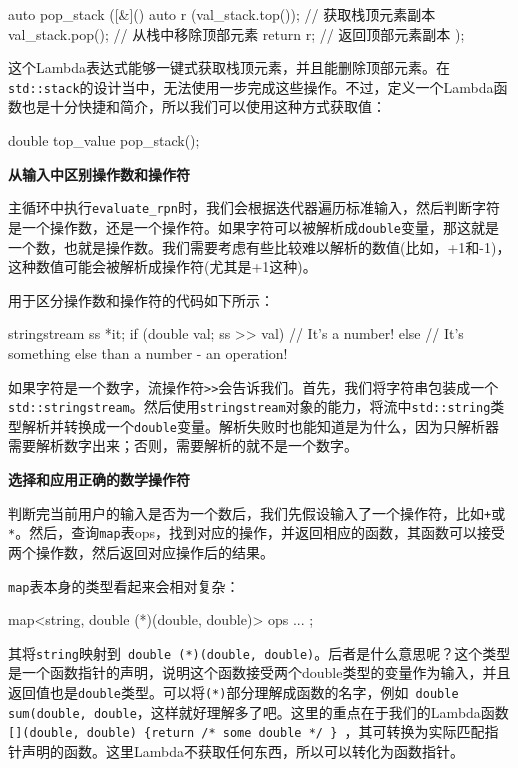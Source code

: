 \begin{codebox}[cpp]
auto pop_stack ([&](){
    auto r (val_stack.top()); // 获取栈顶元素副本
    val_stack.pop(); // 从栈中移除顶部元素
    return r; // 返回顶部元素副本
});
\end{codebox}

这个Lambda表达式能够一键式获取栈顶元素，并且能删除顶部元素。在\texttt{std::stack}的设计当中，无法使用一步完成这些操作。不过，定义一个Lambda函数也是十分快捷和简介，所以我们可以使用这种方式获取值：

\begin{codebox}[cpp]
double top_value {pop_stack()};
\end{codebox}

\textbf{从输入中区别操作数和操作符}

主循环中执行\texttt{evaluate\_rpn}时，我们会根据迭代器遍历标准输入，然后判断字符是一个操作数，还是一个操作符。如果字符可以被解析成\texttt{double}变量，那这就是一个数，也就是操作数。我们需要考虑有些比较难以解析的数值(比如，+1和-1)，这种数值可能会被解析成操作符(尤其是+1这种)。

用于区分操作数和操作符的代码如下所示：

\begin{codebox}[cpp]
stringstream ss {*it};
if (double val; ss >> val) {
    // It's a number!
} else {
    // It's something else than a number - an operation!
}
\end{codebox}

如果字符是一个数字，流操作符\texttt{>>}会告诉我们。首先，我们将字符串包装成一个\texttt{std::stringstream}。然后使用\texttt{stringstream}对象的能力，将流中\texttt{std::string}类型解析并转换成一个\texttt{double}变量。解析失败时也能知道是为什么，因为只解析器需要解析数字出来；否则，需要解析的就不是一个数字。

\textbf{选择和应用正确的数学操作符}

判断完当前用户的输入是否为一个数后，我们先假设输入了一个操作符，比如\texttt{+}或\texttt{*}。然后，查询\texttt{map}表ops，找到对应的操作，并返回相应的函数，其函数可以接受两个操作数，然后返回对应操作后的结果。

\texttt{map}表本身的类型看起来会相对复杂：

\begin{codebox}[cpp]
map<string, double (*)(double, double)> ops { ... };
\end{codebox}

其将\texttt{string}映射到\texttt{ double (*)(double, double)}。后者是什么意思呢？这个类型是一个函数指针的声明，说明这个函数接受两个double类型的变量作为输入，并且返回值也是\texttt{double}类型。可以将\texttt{(*)}部分理解成函数的名字，例如\texttt{ double sum(double, double}，这样就好理解多了吧。这里的重点在于我们的Lambda函数\texttt{[](double, double) \{return /* some double */ \} }，其可转换为实际匹配指针声明的函数。这里Lambda不获取任何东西，所以可以转化为函数指针。

